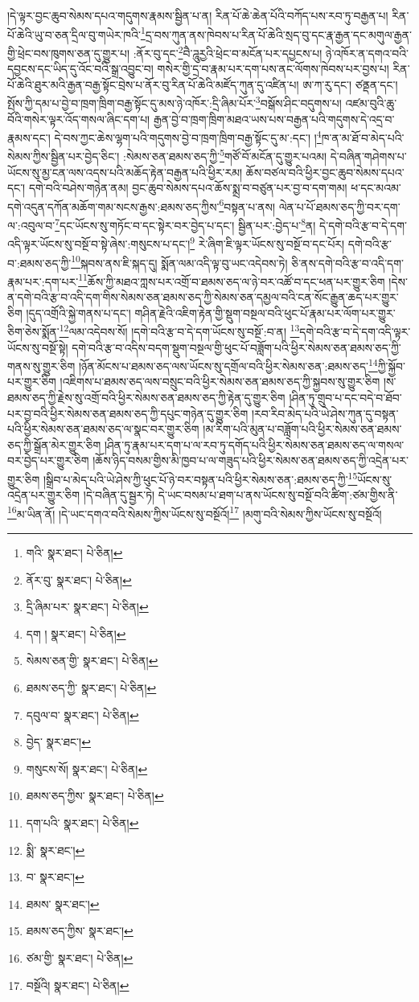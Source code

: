 །དེ་ལྟར་བྱང་ཆུབ་སེམས་དཔའ་གདུགས་རྣམས་སྦྱིན་པ་ན། རིན་པོ་ཆེ་ཆེན་པོའི་བཀོད་པས་རབ་ཏུ་བརྒྱན་པ། རིན་པོ་ཆེའི་ཡུ་བ་ཅན་དྲིལ་བུ་གཡེར་ཁའི་\footnote{གའི་  སྣར་ཐང་།  པེ་ཅིན། }དྲ་བས་ཀུན་ནས་ཁེབས་པ་རིན་པོ་ཆེའི་སྲད་བུ་དང་རྣ་རྒྱན་དང་མགུལ་རྒྱན་གྱི་ཕྲེང་བས་ཁུགས་ཅན་དུ་གྱུར་པ། :ནོར་བུ་དང་\footnote{ནོར་བུ་  སྣར་ཐང་།  པེ་ཅིན། }བཻ་ཌཱུརྱའི་ཕྲེང་བ་མངོན་པར་དཔྱངས་པ། ཉེ་འཁོར་ན་དགའ་བའི་དབྱངས་དང་ཡིད་དུ་འོང་བའི་སྒྲ་འབྱུང་བ། གསེར་གྱི་དྲ་བ་རྣམ་པར་དག་པས་ནང་ལོགས་ཁེབས་པར་བྱས་པ། རིན་པོ་ཆེའི་ཐུར་མའི་རྒྱན་བརྒྱ་སྟོང་བྲེས་པ་ནོར་བུ་རིན་པོ་ཆེའི་མཛོད་ཀུན་དུ་འཛིན་པ། ཨ་ཀ་རུ་དང་། ཙནྡན་དང་། སྤོས་ཀྱི་དམ་པ་བྱེ་བ་ཁྲག་ཁྲིག་བརྒྱ་སྟོང་དུ་མས་ཉེ་འཁོར་:དྲི་ཞིམ་པོར་\footnote{དྲི་ཞིམ་པར་  སྣར་ཐང་།  པེ་ཅིན། }བསྒོས་ཤིང་བདུགས་པ། འཛམ་བུའི་ཆུ་བོའི་གསེར་ལྟར་འོད་གསལ་ཞིང་དག་པ། རྒྱན་བྱེ་བ་ཁྲག་ཁྲིག་མཐའ་ཡས་པས་བརྒྱན་པའི་གདུགས་དེ་འདྲ་བ་རྣམས་དང་། དེ་བས་ཀྱང་ཆེས་ལྷག་པའི་གདུགས་བྱེ་བ་ཁྲག་ཁྲིག་བརྒྱ་སྟོང་དུ་མ་:དང་། །\footnote{དག །  སྣར་ཐང་།  པེ་ཅིན། }ཁ་ན་མ་ཐོ་བ་མེད་པའི་སེམས་ཀྱིས་སྦྱིན་པར་བྱེད་ཅིང་། :སེམས་ཅན་ཐམས་ཅད་ཀྱི་\footnote{སེམས་ཅན་གྱི་  སྣར་ཐང་།  པེ་ཅིན། }གཙོ་བོ་མངོན་དུ་གྱུར་པའམ། དེ་བཞིན་གཤེགས་པ་ཡོངས་སུ་མྱ་ངན་ལས་འདས་པའི་མཆོད་རྟེན་བརྒྱན་པའི་ཕྱིར་རམ། ཆོས་བཙལ་བའི་ཕྱིར་བྱང་ཆུབ་སེམས་དཔའ་དང་། དགེ་བའི་བཤེས་གཉེན་ནམ། བྱང་ཆུབ་སེམས་དཔའ་ཆོས་སྨྲ་བ་བཙུན་པར་བྱ་བ་དག་གམ། ཕ་དང་མའམ་དགེ་འདུན་དཀོན་མཆོག་གམ་སངས་རྒྱས་:ཐམས་ཅད་ཀྱིས་\footnote{ཐམས་ཅད་ཀྱི་  སྣར་ཐང་།  པེ་ཅིན། }བསྟན་པ་ནས། ལེན་པ་པོ་ཐམས་ཅད་ཀྱི་བར་དག་ལ་:འབུལ་བ་\footnote{དབུལ་བ་  སྣར་ཐང་།  པེ་ཅིན། }དང་ཡོངས་སུ་གཏོང་བ་དང་སྟེར་བར་བྱེད་པ་དང་། སྦྱིན་པར་:བྱེད་པ་\footnote{བྱེད་  སྣར་ཐང་། }ན། དེ་དགེ་བའི་རྩ་བ་དེ་དག་འདི་ལྟར་ཡོངས་སུ་བསྔོ་བ་སྟེ་ཞེས་:གསུངས་པ་དང་།\footnote{གསུངས་སོ།  སྣར་ཐང་།  པེ་ཅིན། } རེ་ཞིག་ཇི་ལྟར་ཡོངས་སུ་བསྔོ་བ་དང་པོར། དགེ་བའི་རྩ་བ་:ཐམས་ཅད་ཀྱི་\footnote{ཐམས་ཅད་ཀྱིས་  སྣར་ཐང་།  པེ་ཅིན། }སྐབས་ནས་ཇི་སྐད་དུ། སྨོན་ལམ་འདི་ལྟ་བུ་ཡང་འདེབས་ཏེ། ཅི་ནས་དགེ་བའི་རྩ་བ་འདི་དག་རྣམ་པར་:དག་པར་\footnote{དག་པའི་  སྣར་ཐང་།  པེ་ཅིན། }ཆོས་ཀྱི་མཐའ་ཀླས་པར་འགྲོ་བ་ཐམས་ཅད་ལ་ཉེ་བར་འཚོ་བ་དང་ཕན་པར་གྱུར་ཅིག །དེས་ན་དགེ་བའི་རྩ་བ་འདི་དག་གིས་སེམས་ཅན་ཐམས་ཅད་ཀྱི་སེམས་ཅན་དམྱལ་བའི་ངན་སོང་རྒྱུན་ཆད་པར་གྱུར་ཅིག །དུད་འགྲོའི་སྐྱེ་གནས་པ་དང་། གཤིན་རྗེའི་འཇིག་རྟེན་གྱི་སྡུག་བསྔལ་བའི་ཕུང་པོ་རྣམ་པར་ལོག་པར་གྱུར་ཅིག་ཅེས་སྨོན་\footnote{སྨི་  སྣར་ཐང་། }ལམ་འདེབས་སོ། །དགེ་བའི་རྩ་བ་དེ་དག་ཡོངས་སུ་བསྔོ་:བ་ན། \footnote{བ་  སྣར་ཐང་། }དགེ་བའི་རྩ་བ་དེ་དག་འདི་ལྟར་ཡོངས་སུ་བསྔོ་སྟེ། དགེ་བའི་རྩ་བ་འདིས་བདག་སྡུག་བསྔལ་གྱི་ཕུང་པོ་བཟློག་པའི་ཕྱིར་སེམས་ཅན་ཐམས་ཅད་ཀྱི་གནས་སུ་གྱུར་ཅིག །ཉོན་མོངས་པ་ཐམས་ཅད་ལས་ཡོངས་སུ་དགྲོལ་བའི་ཕྱིར་སེམས་ཅན་:ཐམས་ཅད་\footnote{ཐམས་  སྣར་ཐང་། }ཀྱི་སྐྱོབ་པར་གྱུར་ཅིག །འཇིགས་པ་ཐམས་ཅད་ལས་བསྲུང་བའི་ཕྱིར་སེམས་ཅན་ཐམས་ཅད་ཀྱི་སྐྱབས་སུ་གྱུར་ཅིག །ས་ཐམས་ཅད་ཀྱི་རྗེས་སུ་འགྲོ་བའི་ཕྱིར་སེམས་ཅན་ཐམས་ཅད་ཀྱི་རྟེན་དུ་གྱུར་ཅིག །ཤིན་ཏུ་གྲུབ་པ་དང་བདེ་བ་ཐོབ་པར་བྱ་བའི་ཕྱིར་སེམས་ཅན་ཐམས་ཅད་ཀྱི་དཔུང་གཉེན་དུ་གྱུར་ཅིག །རབ་རིབ་མེད་པའི་ཡེ་ཤེས་ཀུན་དུ་བསྟན་པའི་ཕྱིར་སེམས་ཅན་ཐམས་ཅད་ལ་སྣང་བར་གྱུར་ཅིག །མ་རིག་པའི་མུན་པ་བཟློག་པའི་ཕྱིར་སེམས་ཅན་ཐམས་ཅད་ཀྱི་སྒྲོན་མེར་གྱུར་ཅིག །ཤིན་ཏུ་རྣམ་པར་དག་པ་ལ་རབ་ཏུ་དགོད་པའི་ཕྱིར་སེམས་ཅན་ཐམས་ཅད་ལ་གསལ་བར་བྱེད་པར་གྱུར་ཅིག །ཆོས་ཉིད་བསམ་གྱིས་མི་ཁྱབ་པ་ལ་གཟུད་པའི་ཕྱིར་སེམས་ཅན་ཐམས་ཅད་ཀྱི་འདྲེན་པར་གྱུར་ཅིག །སྒྲིབ་པ་མེད་པའི་ཡེ་ཤེས་ཀྱི་ཕུང་པོ་ཉེ་བར་བསྟན་པའི་ཕྱིར་སེམས་ཅན་:ཐམས་ཅད་ཀྱི་\footnote{ཐམས་ཅད་ཀྱིས་  སྣར་ཐང་། }ཡོངས་སུ་འདྲེན་པར་གྱུར་ཅིག །དེ་བཞིན་དུ་སྦྱར་ཏེ། དེ་ཡང་བསམ་པ་ཐག་པ་ནས་ཡོངས་སུ་བསྔོ་བའི་ཚིག་:ཙམ་གྱིས་ནི་\footnote{ཙམ་གྱི་  སྣར་ཐང་།  པེ་ཅིན། }མ་ཡིན་ནོ། །དེ་ཡང་དགའ་བའི་སེམས་ཀྱིས་ཡོངས་སུ་བསྔོའོ།\footnote{བསྔོའི།  སྣར་ཐང་།  པེ་ཅིན། } །མགུ་བའི་སེམས་ཀྱིས་ཡོངས་སུ་བསྔོའོ། 
